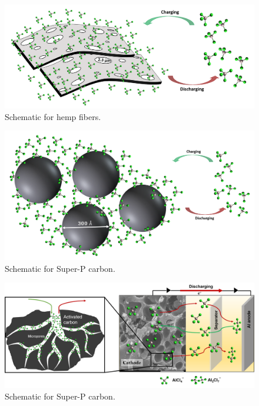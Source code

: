 \documentclass{article}
\begin{document}
\begin{figure}[h]
  \centering
  \includegraphics[width=\textwidth]{figures/fig4}
    \caption{Schematic for hemp fibers.}
  \label{figures:fig1}
\end{figure}
\begin{figure}[h]
  \centering
  \includegraphics[width=\textwidth]{figures/fig5}
    \caption{Schematic for Super-P carbon.}
  \label{figures:fig1}
\end{figure}
\begin{figure}[h]
  \centering
  \includegraphics[width=\textwidth]{figures/fig8}
    \caption{Schematic for Super-P carbon.}
  \label{figures:fig1}
\end{figure}
\end{document}
